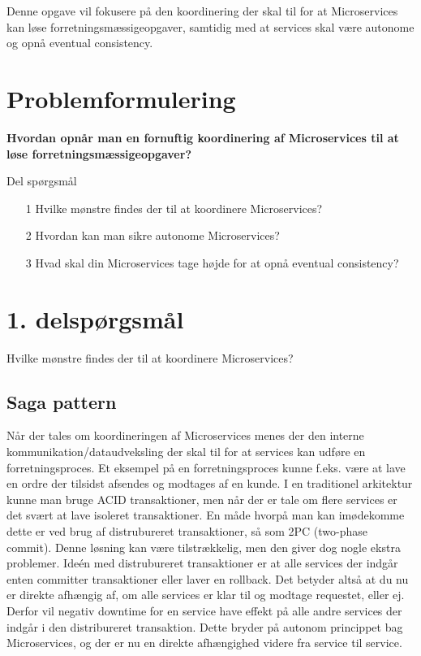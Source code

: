 \documentclass[12pt]{article} %
\begin{document}
\noindent
Denne opgave vil fokusere på den koordinering der skal til for at Microservices kan løse forretningsmæssigeopgaver, samtidig med at services skal være autonome og opnå eventual consistency.
\newline

\newpage
\section{ Problemformulering }

\textbf{Hvordan opnår man en fornuftig koordinering af Microservices til at løse forretningsmæssigeopgaver?}
\newline

\noindent
Del spørgsmål

\begin{itemize}
  \item[1] Hvilke mønstre findes der til at koordinere Microservices?
  \item[2] Hvordan kan man sikre autonome Microservices?
  \item[3] Hvad skal din Microservices tage højde for at opnå eventual consistency?
\end{itemize}

\section{ 1. delspørgsmål }
Hvilke mønstre findes der til at koordinere Microservices?
\subsection{ Saga pattern }
Når der tales om koordineringen af Microservices menes der den interne kommunikation/dataudveksling der skal til for at services kan udføre en forretningsproces. Et eksempel på en forretningsproces kunne f.eks. være at lave en ordre der tilsidst afsendes og modtages af en kunde. I en traditionel arkitektur kunne man bruge ACID transaktioner, men når der er tale om flere services er det svært at lave isoleret transaktioner. En måde hvorpå man kan imødekomme dette er ved brug af distrubureret transaktioner, så som 2PC (two-phase commit). Denne løsning kan være tilstrækkelig, men den giver dog nogle ekstra problemer. Ideén med distrubureret transaktioner er at alle services der indgår enten committer transaktioner eller laver en rollback. Det betyder altså at du nu er direkte afhængig af, om alle services er klar til og modtage requestet, eller ej. Derfor vil negativ downtime for en service have effekt på alle andre services der indgår i den distribureret transaktion\cite{richardson2019microservices}. Dette bryder på autonom princippet bag Microservices, og der er nu en direkte afhængighed videre fra service til service.
\newline
\end{document}
